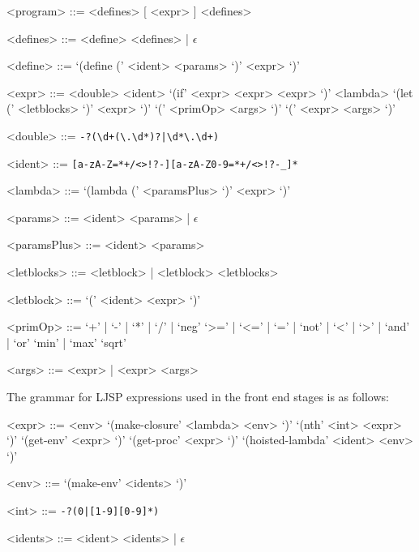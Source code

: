 \documentclass[11pt]{report}
\begin{document}
\begin{grammar}
<program> ::= <defines> [ <expr> ] <defines>

<defines> ::= <define> <defines> | $\epsilon$

<define> ::= `(define (' <ident> <params> `)' <expr> `)'

<expr> ::= <double>
\alt <ident>
\alt `(if' <expr> <expr> <expr> `)'
\alt <lambda>
\alt `(let (' <letblocks> `)' <expr> `)'
\alt `(' <primOp> <args> `)'
\alt `(' <expr> <args> `)'

<double> ::= \texttt{-?(\textbackslash d+(\textbackslash.\textbackslash d*)?|\textbackslash d*\textbackslash.\textbackslash d+)}

<ident> ::= \texttt{[a-zA-Z=*+/\textless\textgreater!?-][a-zA-Z0-9=*+/\textless\textgreater!?-_]*}

<lambda> ::= `(lambda (' <paramsPlus> `)' <expr> `)'

<params> ::= <ident> <params> | $\epsilon$

<paramsPlus> ::= <ident> <params>

<letblocks> ::= <letblock> | <letblock> <letblocks>

<letblock> ::= `(' <ident> <expr> `)'

<primOp> ::= `+' | `-' | `*' | `/' | `neg'
\alt `>=' | `<=' | `=' | `not' | `<' | `>' | `and' | `or'
\alt `min' | `max'
\alt `sqrt'

<args> ::= <expr> | <expr> <args>
\end{grammar}

The grammar for LJSP expressions used in the front end stages is as follows:
\begin{grammar}
<expr> ::= <env>
\alt `(make-closure' <lambda> <env> `)'
\alt `(nth' <int> <expr> `)'
\alt `(get-env' <expr> `)'
\alt `(get-proc' <expr> `)'
\alt `(hoisted-lambda' <ident> <env> `)'

<env> ::= `(make-env' <idents> `)'

<int> ::= \texttt{-?(0|[1-9][0-9]*)}

<idents> ::= <ident> <idents> | $\epsilon$
\end{grammar}
\end{document}
